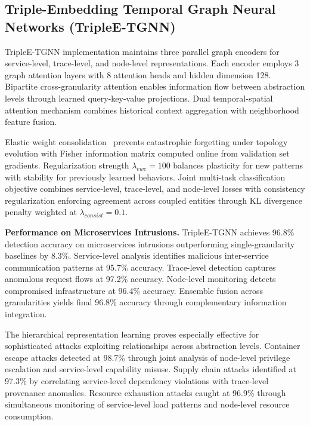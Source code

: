\subsection{Triple-Embedding Temporal Graph Neural Networks (TripleE-TGNN)}

TripleE-TGNN implementation maintains three parallel graph encoders for service-level, trace-level, and node-level representations. Each encoder employs 3 graph attention layers with 8 attention heads and hidden dimension 128. Bipartite cross-granularity attention enables information flow between abstraction levels through learned query-key-value projections. Dual temporal-spatial attention mechanism combines historical context aggregation with neighborhood feature fusion.

Elastic weight consolidation~\cite{kirkpatrick2017overcoming} prevents catastrophic forgetting under topology evolution with Fisher information matrix computed online from validation set gradients. Regularization strength $\lambda_{ewc} = 100$ balances plasticity for new patterns with stability for previously learned behaviors. Joint multi-task classification objective combines service-level, trace-level, and node-level losses with consistency regularization enforcing agreement across coupled entities through KL divergence penalty weighted at $\lambda_{consist} = 0.1$.

\textbf{Performance on Microservices Intrusions.} TripleE-TGNN achieves 96.8\% detection accuracy on microservices intrusions outperforming single-granularity baselines by 8.3\%. Service-level analysis identifies malicious inter-service communication patterns at 95.7\% accuracy. Trace-level detection captures anomalous request flows at 97.2\% accuracy. Node-level monitoring detects compromised infrastructure at 96.4\% accuracy. Ensemble fusion across granularities yields final 96.8\% accuracy through complementary information integration.

The hierarchical representation learning proves especially effective for sophisticated attacks exploiting relationships across abstraction levels. Container escape attacks detected at 98.7\% through joint analysis of node-level privilege escalation and service-level capability misuse. Supply chain attacks identified at 97.3\% by correlating service-level dependency violations with trace-level provenance anomalies. Resource exhaustion attacks caught at 96.9\% through simultaneous monitoring of service-level load patterns and node-level resource consumption.

